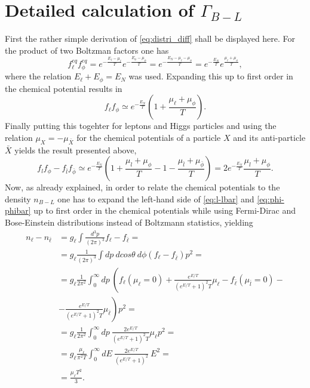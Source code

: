 \section{Detailed calculation of $\Gamma_{B-L}$}
\label{ap:Gamma_B-L}
First the rather simple derivation of \eqref{eq:distri_diff} shall be displayed here. For the product of two Boltzman factors one has
\begin{equation*}
f_\ell^{eq}f_\phi^{eq}=e^{-\frac{E_\ell-\mu_\ell}{T}}e^{-\frac{E_\phi-\mu_\phi}{T}}=e^{-\frac{E_N-\mu_\ell-\mu_\phi}{T}}=e^{-\frac{E_N}{T}}e^{\frac{\mu_\ell+\mu_\phi}{T}},
\end{equation*}
where the relation $E_{\ell}+E_{\phi}=E_{N}$ was used. \newline\indent
Expanding this up to first order in the chemical potential results in
\begin{equation*}
f_\ell f_\phi\simeq e^{-\frac{E_N}{T}}\left(1+\frac{\mu_\ell+\mu_\phi}{T}\right).
\end{equation*}
Finally putting this togehter for leptons and Higgs particles and using the relation $\mu_X=-\mu_{\bar{X}}$ for the chemical potentials of a particle $X$ and its anti-particle $\bar{X}$ yields the result presented above,
\begin{equation*}
f_lf_\phi-f_{\bar{l}}f_{\bar{\phi}}\simeq e^{-\frac{E_N}{T}}\left(1+\frac{\mu_l+\mu_\phi}{T}-1-\frac{\mu_{\bar{l}}+\mu_{\bar{\phi}}}{T}\right)=2e^{-\frac{E_N}{T}}\frac{\mu_l+\mu_\phi}{T}.
\end{equation*}
\newline\indent
Now, as already explained, in order to relate the chemical potentials to the density $n_{B-L}$ one has to expand the left-hand side of \eqref{eq:l-lbar} and \eqref{eq:phi-phibar} up to first order in the chemical potentials while using Fermi-Dirac and Bose-Einstein distributions instead of Boltzmann statistics, yielding
\begin{align*}
	n_\ell-n_{\bar{\ell}}&=g_\ell\int\frac{d^3p}{\left(2\pi\right)^3}f_\ell-f_{\bar{\ell}}=\\
	&=g_\ell\frac{1}{\left(2\pi\right)^3}\int dp\:dcos\theta \:d\phi\left(f_\ell-f_{\bar{\ell}}\right)p^2=\\
	&=g_\ell\frac{1}{2\pi^2}\int_0^\infty dp \: \left(f_\ell\left(\mu_\ell=0\right)+\frac{e^{E/T}}{\left(e^{E/T}+1\right)^2T}\mu_\ell-f_{\bar{\ell}}\left(\mu_{\bar{l}}=0\right)-\right.\\
	&-\left.\frac{e^{E/T}}{\left(e^{E/T}+1\right)^2T}\mu_{\bar{\ell}}\right)p^2=\\
	&=g_\ell\frac{1}{2\pi^2}\int_0^\infty dp\: \frac{2e^{E/T}}{\left(e^{E/T}+1\right)^2T}\mu_\ell p^2=\\
	&=g_\ell\frac{\mu_\ell}{\pi^2T}\int_{0}^{\infty}dE\:\frac{2e^{E/T}}{\left(e^{E/T}+1\right)^2}\:E^2=\\
	&=\frac{\mu_\ell T^2}{3}.
\end{align*}
